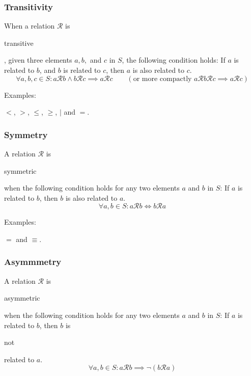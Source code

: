\documentclass[11pt]{article}
\theoremstyle{plain}
\theoremstyle{definition}
\begin{document}
\subsubsection*{ Transitivity}

When a relation $ \mathcal{R} $ is \begin{em}transitive\end{em}, given three elements $ a, b, $ and $ c $ in $ S $, the following condition holds: If $ a $ is related to $ b $, and $ b $ is related to $ c $, then $ a $ is also related to $ c $.
\begin{displaymath}
  \forall a, b, c \in S : a\mathcal{R}b \wedge b\mathcal{R}c \implies a\mathcal{R}c  \quad \quad (\text{or more compactly } a\mathcal{R}b\mathcal{R}c \implies a\mathcal{R}c)
\end{displaymath}

\noindent \begin{em}Examples:\end{em} $ < $, $ > $, $ \le $, $ \ge $, $ | $ and $ = $.

\subsubsection*{ Symmetry}

A relation $ \mathcal{R} $ is \begin{em}symmetric\end{em} when the following condition holds for any two elements $ a $ and $ b $ in $ S $: If $ a $ is related to $ b $, then $ b $ is also related to $ a $.
\begin{displaymath}
	\forall a, b \in S : a\mathcal{R}b \iff b\mathcal{R}a
\end{displaymath}

\noindent \begin{em}Examples:\end{em} $ = $ and $ \equiv $.

\subsubsection*{ Asymmmetry}

A relation $ \mathcal{R} $ is \begin{em}asymmetric\end{em} when the following condition holds for any two elements $ a $ and $ b $ in $ S $: If $ a $ is related to $ b $, then $ b $ is \begin{em}not\end{em} related to $ a $.
\begin{displaymath}
  \forall a, b \in S : a\mathcal{R}b \implies \neg(b\mathcal{R}a)
\end{displaymath}
\end{document}

